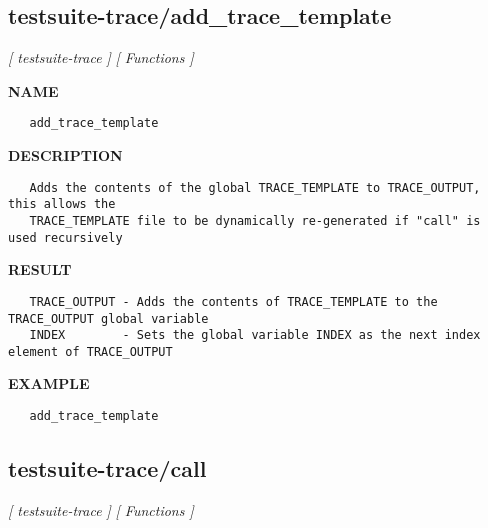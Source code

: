 \subsection{testsuite-trace/add\_trace\_template}
\textsl{[ testsuite-trace ]}
\textsl{[ Functions ]}

\label{ch:robo49}
\label{ch:testsuite_trace_add_trace_template}
\textbf{NAME}
\begin{verbatim}
   add_trace_template
\end{verbatim}
\textbf{DESCRIPTION}
\begin{verbatim}
   Adds the contents of the global TRACE_TEMPLATE to TRACE_OUTPUT, this allows the
   TRACE_TEMPLATE file to be dynamically re-generated if "call" is used recursively
\end{verbatim}
\textbf{RESULT}
\begin{verbatim}
   TRACE_OUTPUT - Adds the contents of TRACE_TEMPLATE to the TRACE_OUTPUT global variable
   INDEX        - Sets the global variable INDEX as the next index element of TRACE_OUTPUT
\end{verbatim}
\textbf{EXAMPLE}
\begin{verbatim}
   add_trace_template
\end{verbatim}
\newpage
\subsection{testsuite-trace/call}
\textsl{[ testsuite-trace ]}
\textsl{[ Functions ]}

